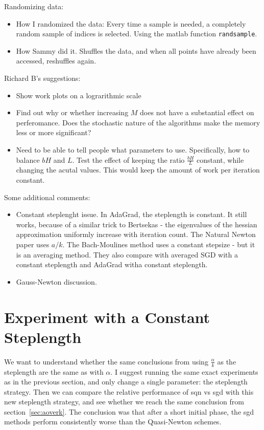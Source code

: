 \documentclass[12pt]{article}
\begin{document}
Randomizing data:
\begin{itemize}
	\item How I randomized the data: Every time a sample is needed, a completely random sample of indices is selected. Using the matlab function {\tt randsample}.
	\item How Sammy did it. Shuffles the data, and when all points have already been accessed, reshuffles again. 
\end{itemize}

Richard B's suggestions:
\begin{itemize}
	\item Show work plots on a lograrithmic scale
	\item Find out why or whether increasing $M$ does not have a substantial effect on perferomance. Does the stochastic nature of the algorithms make the memory less or more significant?
	\item Need to be able to tell people what parameters to use. Specifically, how to balance $bH$ and $L$. Test the effect of keeping the ratio $\frac{bH}{L}$ constant, while changing the acutal values. This would keep the amount of work per iteration constant. 
\end{itemize}

Some additional comments:
\begin{itemize}
	\item Constant steplenght issue. In AdaGrad, the steplength is constant. It still works, because of a similar trick to Bertsekas - the eigenvalues of the hessian approximation uniformly increase with iteration count. The Natural Newton paper uses $a/k$. The Bach-Moulines method uses a constant stepsize - but it is an averaging method. They also compare with averaged SGD with a constant steplength and AdaGrad witha constant steplength. 
	\item Gauss-Newton discussion. 
\end{itemize}

\section{Experiment with a Constant Steplength}

We want to understand whether the same conclusions from using $\frac{\alpha}{k}$ as the steplength are the same as with $\alpha$. I suggest running the same exact experiments as in the previous section, and only change a single parameter: the steplength strategy. Then we can compare the relative performance of sqn vs sgd with this new steplength strategy, and see whether we reach the same conclusion from section~\ref{sec:aoverk}. The conclusion was that after a short initial phase, the sgd methods perform consistently worse than the Quasi-Newton schemes. 
\end{document}
